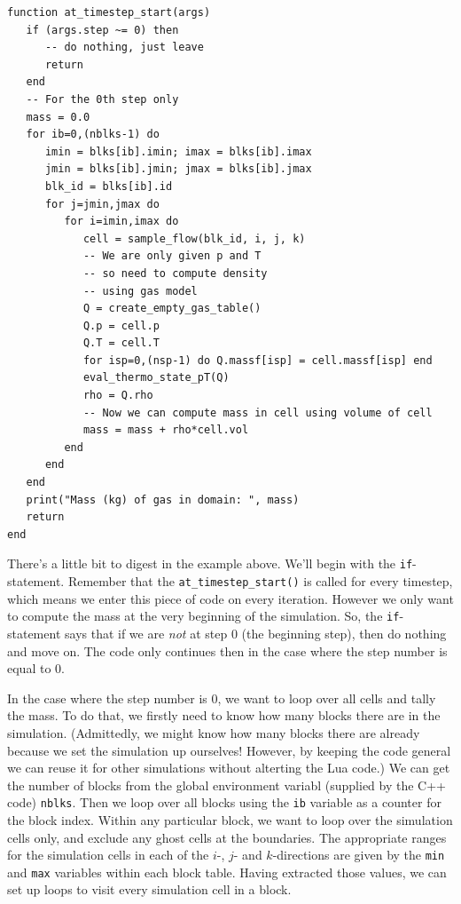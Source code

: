 \begin{verbatim}
function at_timestep_start(args)
   if (args.step ~= 0) then
      -- do nothing, just leave
      return
   end
   -- For the 0th step only
   mass = 0.0
   for ib=0,(nblks-1) do
      imin = blks[ib].imin; imax = blks[ib].imax
      jmin = blks[ib].jmin; jmax = blks[ib].jmax
      blk_id = blks[ib].id
      for j=jmin,jmax do
         for i=imin,imax do
            cell = sample_flow(blk_id, i, j, k)
            -- We are only given p and T
            -- so need to compute density
            -- using gas model
            Q = create_empty_gas_table()
            Q.p = cell.p
            Q.T = cell.T
            for isp=0,(nsp-1) do Q.massf[isp] = cell.massf[isp] end
            eval_thermo_state_pT(Q)
            rho = Q.rho
            -- Now we can compute mass in cell using volume of cell
            mass = mass + rho*cell.vol
         end
      end
   end
   print("Mass (kg) of gas in domain: ", mass)
   return
end
\end{verbatim}

There's a little bit to digest in the example above. 
We'll begin with the \verb!if!-statement.
Remember that the \verb!at_timestep_start()! is called for
every timestep, which means we enter this piece of code
on every iteration.
However we only want to compute the mass at
the very beginning of the simulation.
So, the \verb!if!-statement says that if we are \emph{not}
at step 0 (the beginning step), then do nothing and move on.
The code only continues then in the case where the
step number is equal to 0.

In the case where the step number is 0, we want to loop
over all cells and tally the mass.
To do that, we firstly need to know how many blocks there are in the
simulation. (Admittedly, we might know how many blocks there
are already because we set the simulation up ourselves!
However, by keeping the code general we can reuse it
for other simulations without alterting the Lua code.)
We can get the number of blocks from the global environment
variabl (supplied by the C++ code) \verb!nblks!.
Then we loop over all blocks using the \verb!ib! variable
as a counter for the block index.
Within any particular block, we want to loop over the
simulation cells only, and exclude any ghost cells at
the boundaries.
The appropriate ranges for the simulation cells
in each of the $i$-, $j$- and $k$-directions are
given by the \verb!min! and \verb!max! variables
within each block table.
Having extracted those values, we can set up
loops to visit every simulation cell in a block.

